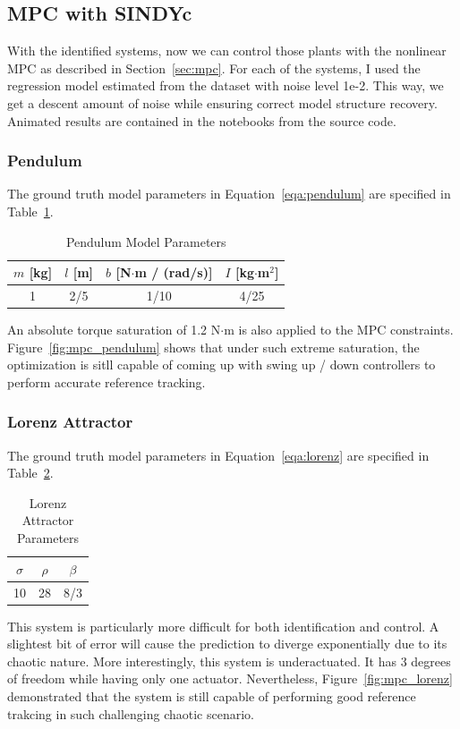 \documentclass[10pt,twocolumn]{article}
\begin{document}
\subsection{MPC with SINDYc}

With the identified systems, now we can control those plants with the nonlinear MPC as
described in Section~\ref{sec:mpc}. For each of the systems, I used the regression model
estimated from the dataset with noise level 1e-2. This way, we get a descent amount of
noise while ensuring correct model structure recovery. Animated results are contained
in the notebooks from the source code.

\subsubsection{Pendulum}

The ground truth model parameters in Equation~\ref{eqa:pendulum}
are specified in Table~\ref{tbl:pendulum_params}.
\begin{table}[h]
  \centering
  \begin{tabular}{cccc}
    \toprule
    $m$ [kg] & $l$ [m] & $b$ [N$\cdot$m / (rad/s)] & $I$ [kg$\cdot$m$^2$] \\
    \midrule
    1 & 2/5 & 1/10 & 4/25 \\
    \bottomrule
  \end{tabular}
  \caption{Pendulum Model Parameters}
  \label{tbl:pendulum_params}
\end{table}
An absolute torque saturation of 1.2 N$\cdot$m is also applied to the MPC constraints.
Figure~\ref{fig:mpc_pendulum} shows that under such extreme saturation, the optimization
is sitll capable of coming up with swing up / down controllers to perform
accurate reference tracking.

\subsubsection{Lorenz Attractor}

The ground truth model parameters in Equation~\ref{eqa:lorenz} are specified in
Table~\ref{tbl:lorenz_params}.
\begin{table}[h]
  \centering
  \begin{tabular}{ccc}
    \toprule
    $\sigma$ & $\rho$ & $\beta$ \\
    \midrule
    10 & 28 & 8/3 \\
    \bottomrule
  \end{tabular}
  \caption{Lorenz Attractor Parameters}
  \label{tbl:lorenz_params}
\end{table}
This system is particularly more difficult for both identification and control. A slightest
bit of error will cause the prediction to diverge exponentially due to its chaotic nature.
More interestingly, this system is underactuated. It has 3 degrees of freedom while having
only one actuator. Nevertheless, Figure~\ref{fig:mpc_lorenz} demonstrated that the system
is still capable of performing good reference trakcing in such challenging chaotic scenario.
\end{document}
